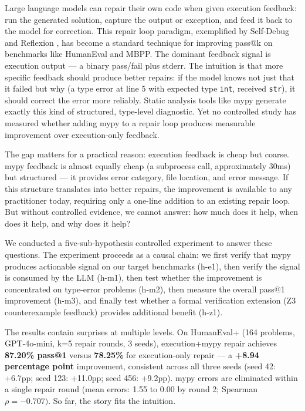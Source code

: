 
Large language models can repair their own code when given execution feedback: run the generated solution, capture the output or exception, and feed it back to the model for correction. This repair loop paradigm, exemplified by Self-Debug \citep{Chen2023Teaching} and Reflexion \citep{Shinn2023Reflexion}, has become a standard technique for improving pass@k on benchmarks like HumanEval and MBPP. The dominant feedback signal is execution output --- a binary pass/fail plus stderr. The intuition is that more specific feedback should produce better repairs: if the model knows not just that it failed but why (a type error at line 5 with expected type \texttt{int}, received \texttt{str}), it should correct the error more reliably. Static analysis tools like mypy generate exactly this kind of structured, type-level diagnostic. Yet no controlled study has measured whether adding mypy to a repair loop produces measurable improvement over execution-only feedback.

The gap matters for a practical reason: execution feedback is cheap but coarse. mypy feedback is almost equally cheap (a subprocess call, approximately 30ms) but structured --- it provides error category, file location, and error message. If this structure translates into better repairs, the improvement is available to any practitioner today, requiring only a one-line addition to an existing repair loop. But without controlled evidence, we cannot answer: how much does it help, when does it help, and why does it help?

We conducted a five-sub-hypothesis controlled experiment to answer these questions. The experiment proceeds as a causal chain: we first verify that mypy produces actionable signal on our target benchmarks (h-e1), then verify the signal is consumed by the LLM (h-m1), then test whether the improvement is concentrated on type-error problems (h-m2), then measure the overall pass@1 improvement (h-m3), and finally test whether a formal verification extension (Z3 counterexample feedback) provides additional benefit (h-z1).

The results contain surprises at multiple levels. On HumanEval+ (164 problems, GPT-4o-mini, k=5 repair rounds, 3 seeds), execution+mypy repair achieves \textbf{87.20\% pass@1} versus \textbf{78.25\%} for execution-only repair --- a \textbf{+8.94 percentage point} improvement, consistent across all three seeds (seed 42: +6.7pp; seed 123: +11.0pp; seed 456: +9.2pp). mypy errors are eliminated within a single repair round (mean errors: 1.55 to 0.00 by round 2; Spearman $\rho = -0.707)$. So far, the story fits the intuition.

